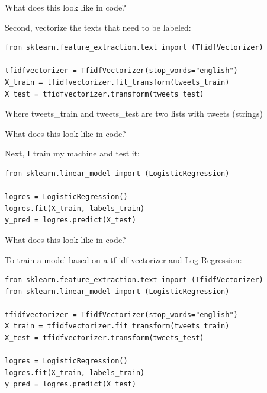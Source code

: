 \documentclass[handout]{beamer}
\begin{document}
\begin{frame}[fragile]{What does this look like in code?}
	
Second, vectorize the texts that need to be labeled: 

\begin{lstlisting}
from sklearn.feature_extraction.text import (TfidfVectorizer)

tfidfvectorizer = TfidfVectorizer(stop_words="english")
X_train = tfidfvectorizer.fit_transform(tweets_train)
X_test = tfidfvectorizer.transform(tweets_test)

\end{lstlisting}

Where tweets\_train and tweets\_test are two lists with tweets (strings)
	
\end{frame}


\begin{frame}[fragile]{What does this look like in code?}
	
Next, I train my machine and test it: 
	
\begin{lstlisting}
from sklearn.linear_model import (LogisticRegression)

logres = LogisticRegression()
logres.fit(X_train, labels_train)
y_pred = logres.predict(X_test)
\end{lstlisting}
	
\end{frame}


\begin{frame}[fragile]{What does this look like in code?}
	
To train a model based on a tf-idf vectorizer and Log Regression:
	
\begin{lstlisting}
from sklearn.feature_extraction.text import (TfidfVectorizer)
from sklearn.linear_model import (LogisticRegression)

tfidfvectorizer = TfidfVectorizer(stop_words="english")
X_train = tfidfvectorizer.fit_transform(tweets_train)
X_test = tfidfvectorizer.transform(tweets_test)

logres = LogisticRegression()
logres.fit(X_train, labels_train)
y_pred = logres.predict(X_test)
\end{lstlisting}
	
\end{frame}
\end{document}
